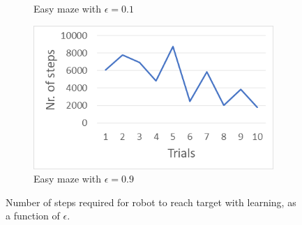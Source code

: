 \begin{figure}[H]
\begin{subfigure}{.48\textwidth}
    \caption{Easy maze with $\epsilon = 0.1$}
    \label{fig:easy_maze_low_epsilon}
\end{subfigure}
\begin{subfigure}{.48\textwidth}
  \centering
  \includegraphics[width=1\linewidth]{images/2.2training/9Graph4.png}
      \caption{Easy maze with $\epsilon = 0.9$}
    \label{fig:easy_maze_high_epsilon}
\end{subfigure}
\caption{Number of steps required for robot to reach target with learning, as a function of $\epsilon$.}
\end{figure}


